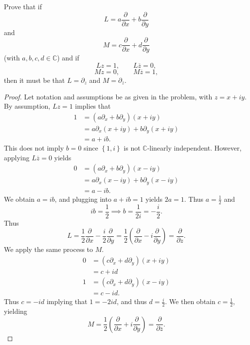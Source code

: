 \documentclass[11pt, letterpaper]{article}
\begin{document}
\begin{problem}
	Prove that if
	\[
		L=a \frac{\partial }{\partial x} +b \frac{\partial }{\partial y} 
	\]
	and
	\[
		M=c \frac{\partial }{\partial x} +d\frac{\partial }{\partial y} 
	\]
	(with $a,b,c,d\in\mathbb{C} $) and if
	\[
		Lz=1,\qquad L \overline{z} =0,
	\]
	\[
		Mz=0,\qquad M \overline{z} =1,
	\]
	then it must be that $L=\partial _z$ and $M=\partial _{\overline{z} } $.
\end{problem}
\begin{proof}
	Let notation and assumptions be as given in the problem, with $z=x+iy$. By assumption, $Lz=1$ implies that
	\begin{align*}
		1&=\left( a \partial _x+b \partial _y \right) (x+iy)\\
		 &=a \partial _x(x+iy)+b \partial _y(x+iy)\\
		 &=a+ib
	.\end{align*}
	This does not imply $b=0$ since $\left\{ 1,i \right\} $ is not $\mathbb{C} $-linearly independent. However, applying $L \overline{z} =0$ yields
	\begin{align*}
		0&=\left( a \partial _x+b \partial _y \right) \left( x-iy \right) \\
		 &=a \partial _x(x-iy)+b \partial _y(x-iy)\\
		 &=a-ib
	.\end{align*}
	We obtain $a=ib$, and plugging into $a+ib=1$ yields $2a=1$. Thus $a=\frac{1}{2} $ and
	\[
		ib=\frac{1}{2} \implies b=\frac{1}{2i} =-\frac{i}{2} 
	.\]
	Thus
	\[
		L=\frac{1}{2} \frac{\partial }{\partial x} -\frac{i}{2} \frac{\partial }{\partial y} =\frac{1}{2} \left( \frac{\partial }{\partial x} -i \frac{\partial }{\partial y}  \right) =\frac{\partial }{\partial z} 
	.\]
	We apply the same process to $M$.
	\begin{align*}
		0&=\left( c \partial _x+d \partial _y \right) (x+iy)\\
		 &=c+id\\
		1&=\left( c \partial _x+d \partial _y \right) (x-iy)\\
		 &=c-id
	.\end{align*}
	Thus $c=-id$ implying that $1=-2id$, and thus $d=\frac{i}{2} $. We then obtain $c=\frac{1}{2} $, yielding
	\[
		M=\frac{1}{2} \left( \frac{\partial }{\partial x} +i \frac{\partial }{\partial y}  \right) =\frac{\partial }{\partial \overline{z} } 
	.\]
\end{proof}
\end{document}
